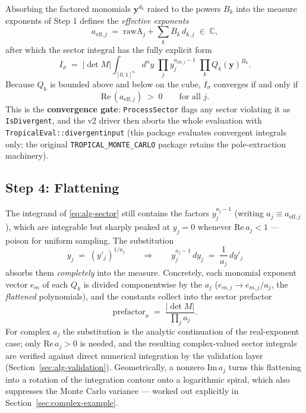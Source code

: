 \documentclass[11pt,a4paper]{article}
\begin{document}
Absorbing the factored monomials $\mathbf{y}^{d_k}$ raised to the powers $B_k$
into the measure exponents of Step 1 defines the \emph{effective exponents}
\begin{equation}\label{eq:alg-aeff}
a_{\mathrm{eff},j} \;=\; \mathrm{rawA}_j + \sum_k B_k \, d_{k,j} \;\in\; \mathbb{C},
\end{equation}
after which the sector integral has the fully explicit form
\begin{equation}\label{eq:alg-sector}
I_\sigma \;=\; |\det M| \int_{[0,1]^n} d^n y\;
\prod_j y_j^{a_{\mathrm{eff},j} - 1} \;\prod_k Q_k(\mathbf{y})^{B_k}.
\end{equation}
Because $Q_k$ is bounded above and below on the cube, $I_\sigma$ converges if
and only if
\begin{equation}
\mathrm{Re}\,(a_{\mathrm{eff},j}) \;>\; 0 \qquad \text{for all } j .
\end{equation}
This is the \textbf{convergence gate}: \texttt{ProcessSector} flags any sector
violating it as \texttt{IsDivergent}, and the v2 driver then aborts the whole
evaluation with \texttt{TropicalEval::divergentinput} (this package evaluates
convergent integrals only; the original \texttt{TROPICAL\_MONTE\_CARLO}
package retains the pole-extraction machinery).

\subsection{Step 4: Flattening}\label{sec:alg-flatten}

The integrand of \eqref{eq:alg-sector} still contains the factors
$y_j^{a_j - 1}$ (writing $a_j \equiv a_{\mathrm{eff},j}$), which are
integrable but sharply peaked at $y_j = 0$ whenever $\mathrm{Re}\,a_j < 1$ ---
poison for uniform sampling. The substitution
\begin{equation}
y_j \;=\; (y'_j)^{1/a_j}
\qquad\Longrightarrow\qquad
y_j^{a_j - 1}\, dy_j \;=\; \frac{1}{a_j}\, dy'_j
\end{equation}
absorbs them \emph{completely} into the measure. Concretely, each monomial
exponent vector $e_m$ of each $Q_k$ is divided componentwise by the $a_j$
($e_{m,j} \to e_{m,j}/a_j$, the \emph{flattened} polynomials), and the
constants collect into the sector prefactor
\begin{equation}
\mathrm{prefactor}_\sigma \;=\; \frac{|\det M|}{\prod_j a_j}.
\end{equation}
For complex $a_j$ the substitution is the analytic continuation of the
real-exponent case; only $\mathrm{Re}\,a_j > 0$ is needed, and the resulting
complex-valued sector integrals are verified against direct numerical
integration by the validation layer (Section~\ref{sec:alg-validation}).
Geometrically, a nonzero $\mathrm{Im}\,a_j$ turns this flattening into a
rotation of the integration contour onto a logarithmic spiral, which also
suppresses the Monte Carlo variance --- worked out explicitly in
Section~\ref{sec:complex-example}.
\end{document}
